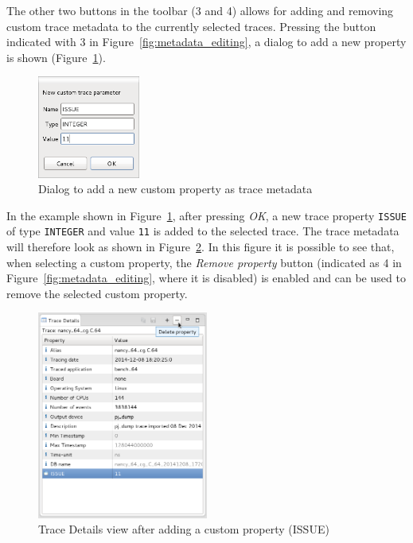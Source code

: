 \documentclass[twoside]{article}
\begin{document}
\begin{sloppypar}
The other two buttons in the toolbar (\num{3} and \num{4}) allows for adding and removing custom trace metadata to the currently selected traces. Pressing the button indicated with \num{3} in Figure~\ref{fig:metadata_editing}, a dialog to add a new property is shown (Figure~\ref{fig:new_metadata}).

\begin{figure}[h!]
  \centering
    \includegraphics[width=0.3\textwidth]{images/new_metadata.png}
  \caption{Dialog to add a new custom property as trace metadata}
  \label{fig:new_metadata}
\end{figure}

In the example shown in Figure~\ref{fig:new_metadata}, after pressing \emph{OK}, a new trace property \texttt{ISSUE} of type \texttt{INTEGER} and value \texttt{11} is added to the selected trace. The trace metadata will therefore look as shown in Figure~\ref{fig:metadata_remove}. In this figure it is possible to see that, when selecting a custom property, the \emph{Remove property} button (indicated as \num{4} in Figure~\ref{fig:metadata_editing}, where it is disabled) is enabled and can be used to remove the selected custom property.

\begin{figure}[h!]
  \centering
    \includegraphics[width=0.5\textwidth]{images/metadata_remove.png}
  \caption{Trace Details view after adding a custom property (ISSUE)}
  \label{fig:metadata_remove}
\end{figure}


\end{sloppypar}
\end{document}
